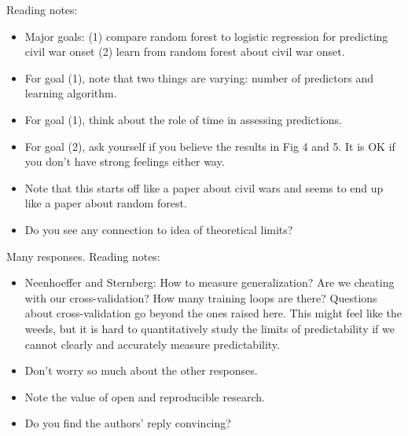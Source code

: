 \documentclass[aspectratio=169]{beamer}
\begin{document}
\begin{frame}

Reading notes:
\begin{itemize}
\item Major goals: (1) compare random forest to logistic regression for predicting civil war onset (2) learn from random forest about civil war onset.
\pause
\item For goal (1), note that two things are varying: number of predictors and learning algorithm. 
\pause
\item For goal (1), think about the role of time in assessing predictions.
\pause
\item For goal (2), ask yourself if you believe the results in Fig 4 and 5. It is OK if you don't have strong feelings either way. 
\pause
\item Note that this starts off like a paper about civil wars and seems to end up like a paper about random forest.
\pause
\item Do you see any connection to idea of theoretical limits?
\end{itemize}

\end{frame}
\begin{frame}

Many responses.  Reading notes:
\begin{itemize}
\item Neenhoeffer and Sternberg: How to measure generalization? Are we cheating with our cross-validation? How many training loops are there? Questions about cross-validation go beyond the ones raised here.  This might feel like the weeds, but it is hard to quantitatively study the limits of predictability if we cannot clearly and accurately measure predictability.
\pause
\item Don't worry so much about the other responses.
\pause
\item Note the value of open and reproducible research.
\pause
\item Do you find the authors' reply convincing?
\end{itemize}

\end{frame}
\frame{\titlepage}
\end{document}

